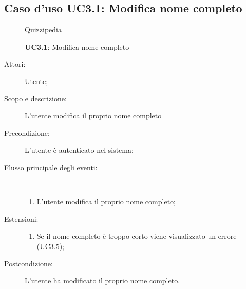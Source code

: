 \subsection{Caso d'uso UC3.1: Modifica nome completo}
	\begin{figure}[H]
		\centering
		\begin{resizedtikzpicture}{\textwidth}
		\begin{umlsystem}[x=0, fill=lightgray!20]{Quizzipedia}
		\end{umlsystem}
		\end{resizedtikzpicture}
		\caption{\textbf{UC3.1}: Modifica nome completo}
		\label{UC3.1}
	\end{figure}
\begin{description}
\item[Attori:] Utente;
\item[Scopo e descrizione:] L'utente modifica il proprio nome completo
      \item[Precondizione:] L'utente è autenticato nel sistema;

        \item[Flusso principale degli eventi:] \ 
 \begin{enumerate}
          \item L’utente modifica il proprio nome completo;

      \end{enumerate}
    \item[Estensioni:]
      \begin{enumerate}
          \item Se il nome completo è troppo corto viene visualizzato un errore (\hyperlink{UC3.5}{UC3.5});

      \end{enumerate}
    \item[Postcondizione:] L'utente ha modificato il proprio nome completo.
  \end{description}
\hypertarget{UC3.2}{}
